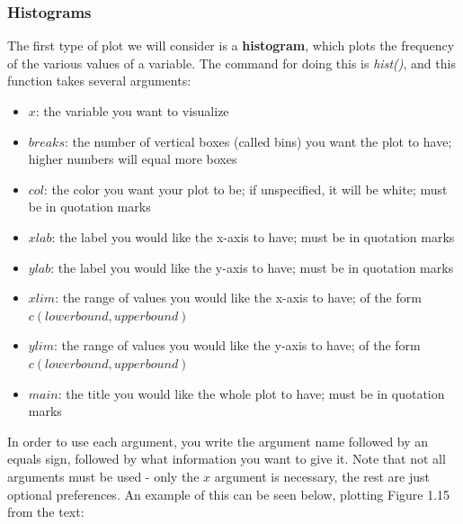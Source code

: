 \documentclass[11pt]{article}\usepackage[]{graphicx}\usepackage[]{color}
\begin{document}
\subsubsection{Histograms}
The first type of plot we will consider is a \textbf{histogram}, which plots the frequency of the various values of a variable.  The command for doing this is \textit{hist()}, and this function takes several arguments:
\begin{itemize}
\item $x$: the variable you want to visualize
\item $breaks$: the number of vertical boxes (called bins) you want the plot to have; higher numbers will equal more boxes
\item $col$: the color you want your plot to be; if unspecified, it will be white; must be in quotation marks
\item $xlab$: the label you would like the x-axis to have; must be in quotation marks
\item $ylab$: the label you would like the y-axis to have; must be in quotation marks
\item $xlim$: the range of values you would like the x-axis to have; of the form $c(lower bound, upper bound)$
\item $ylim$: the range of values you would like the y-axis to have; of the form $c(lower bound, upper bound)$
\item $main$: the title you would like the whole plot to have; must be in quotation marks
\end{itemize}
In order to use each argument, you write the argument name followed by an equals sign, followed by what information you want to give it.  Note that not all arguments must be used - only the $x$ argument is necessary, the rest are just optional preferences.  An example of this can be seen below, plotting Figure 1.15 from the text:
\end{document}
